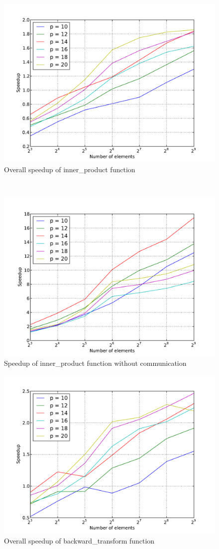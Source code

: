 \documentclass{ccr16}
\begin{document}
{        \begin{figure}[h]
            \centering
            \includegraphics[trim = {0in 0.3in 0in 0.3in}, width = 0.5 \textwidth]{./plots/PDBM_speedup_inner.pdf}
            \caption{Overall speedup of \textup{inner\_product} function}
            \label{PDBM:fig:speedup_inner}
        \end{figure}
        ~
        \begin{figure}[h]
            \centering
            \includegraphics[trim = {0in 0.3in 0in 0.3in}, width = 0.5 \textwidth]{./plots/PDBM_speedup_no_comm_inner.pdf}
            \caption{Speedup of \textup{inner\_product} function without communication}
            \label{PDBM:fig:speedup_no_comm_inner}
        \end{figure}

        \begin{figure}[h]
            \centering
            \includegraphics[trim = {0in 0.3in 0in 0.3in}, width = 0.5 \textwidth]{./plots/PDBM_speedup_backward.pdf}
            \caption{Overall speedup of \textup{backward\_transform} function}
            \label{PDBM:fig:speedup_backward}
        \end{figure}

}
\end{document}
